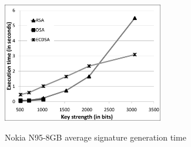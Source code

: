 \documentclass[authoryear]{elsarticle}
\begin{document}
\begin{figure}[ht]
\begin{center}
  \includegraphics[width=7cm]{immagini/N95Sign.pdf}\\
  \caption{Nokia N95-8GB average signature generation time}
  \label{fig:N95Sign}
\end{center}
\end{figure}


\end{document}
